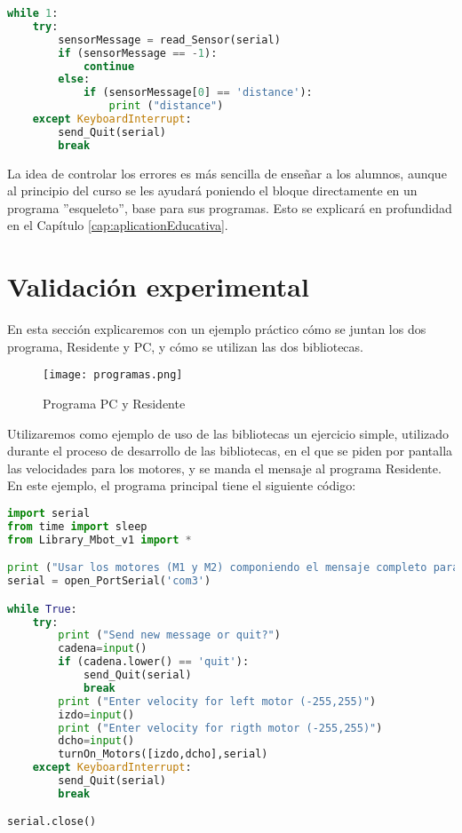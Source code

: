 \newpage
\begin{lstlisting}[language=python,caption={Ejemplo de finalización de programa con control de errores},captionpos=b]
while 1:
	try:
		sensorMessage = read_Sensor(serial)    
		if (sensorMessage == -1):
			continue
		else:
			if (sensorMessage[0] == 'distance'):
				print ("distance")
	except KeyboardInterrupt:
		send_Quit(serial)
		break
\end{lstlisting}


La idea de controlar los errores es más sencilla de enseñar a los alumnos, aunque al principio del curso se les ayudará poniendo el bloque directamente en un programa ''esqueleto'', base para sus programas. Esto se explicará en profundidad en el Capítulo \ref{cap:aplicationEducativa}.

\section{Validación experimental}\label{sec:resultado}
En esta sección explicaremos con un ejemplo práctico cómo se juntan los dos programa, Residente y PC, y cómo se utilizan las dos bibliotecas. \\

\begin{figure}[h]
	\centering
	\texttt{[image: programas.png]}
	\label{img:Mix}
	\caption{Programa PC y Residente}
\end{figure} 
\vspace{1cm}
Utilizaremos como ejemplo de uso de las bibliotecas un ejercicio simple, utilizado durante el proceso de desarrollo de las bibliotecas, en el que se piden por pantalla las velocidades para los motores, y se manda el mensaje al programa Residente.\\
En este ejemplo, el programa principal tiene el siguiente código:
\begin{lstlisting}[language=python,caption={Ejemplo de uso de PyBoKids 2.0},captionpos=b]
import serial
from time import sleep
from Library_Mbot_v1 import *

print ("Usar los motores (M1 y M2) componiendo el mensaje completo para mandar exactamente los valores")
serial = open_PortSerial('com3')

while True:
	try:
		print ("Send new message or quit?")
		cadena=input()
		if (cadena.lower() == 'quit'):
			send_Quit(serial)
			break
		print ("Enter velocity for left motor (-255,255)")
		izdo=input()
		print ("Enter velocity for rigth motor (-255,255)")
		dcho=input()
		turnOn_Motors([izdo,dcho],serial)
	except KeyboardInterrupt:
		send_Quit(serial)
		break

serial.close()
\end{lstlisting}


